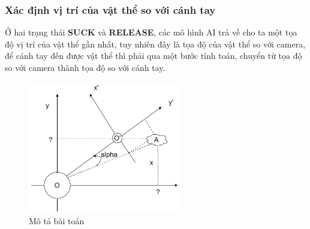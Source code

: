 \subsubsection{Xác định vị trí của vật thể so với cánh tay}
Ở hai trạng thái \textbf{SUCK} và \textbf{RELEASE}, các mô hình AI trả về cho ta một tọa độ vị trí của vật thể gần nhất, tuy nhiên đây là tọa độ của vật thể so với camera, để cánh tay đến được vật thể thì phải qua một bước tính toán, chuyển từ tọa độ so với camera thành tọa độ so với cánh tay.
\begin{figure}[!h]
    \centering
    \includegraphics[width=0.6\textwidth]{Images/Implementation/AI/AI_math_1.jpg}
    \caption{Mô tả bài toán}
\end{figure}

